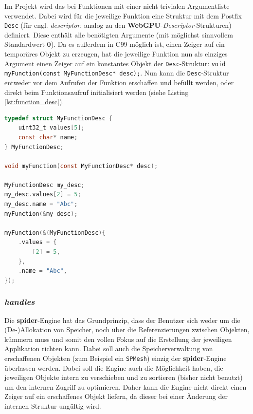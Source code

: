 \documentclass[oneside]{ausarbeitung}
\begin{document}
Im Projekt wird das bei Funktionen mit einer nicht trivialen Argumentliste verwendet. Dabei wird für die jeweilige Funktion eine Struktur mit dem Postfix \texttt{Desc} (für engl. \textit{descriptor}, analog zu den \textbf{WebGPU}-\textit{Descriptor}-Strukturen) definiert. Diese enthält alle benötigten Argumente (mit möglichst sinnvollem Standardwert \textbf{0}). Da es außerdem in C99 möglich ist, einen Zeiger auf ein temporäres Objekt zu erzeugen, hat die jeweilige Funktion nun als einziges Argument einen Zeiger auf ein konstantes Objekt der \texttt{Desc}-Struktur: \texttt{void myFunction(const MyFunctionDesc* desc);}. Nun kann die \texttt{Desc}-Struktur entweder vor dem Aufrufen der Funktion erschaffen und befüllt werden, oder direkt beim Funktionsaufruf initialisiert werden (siehe Listing \ref{lst:function_desc}).

\begin{minipage}{\textwidth}
\begin{lstlisting}[language=C, label={lst:function_desc}, caption={Verwendung einer \textit{Desc}-Struktur zum Übergeben von Argumenten an eine Funktion}]
typedef struct MyFunctionDesc {
	uint32_t values[5];
	const char* name;
} MyFunctionDesc;

void myFunction(const MyFunctionDesc* desc);

MyFunctionDesc my_desc;
my_desc.values[2] = 5;
my_desc.name = "Abc";
myFunction(&my_desc);

myFunction(&(MyFunctionDesc){
	.values = {
		[2] = 5,
	},
	.name = "Abc",
});
\end{lstlisting}
\end{minipage}

\subsubsection{\textit{handles} \cite[Vgl.][]{weissflog:handles}}
\label{subsub:handles}

Die \textbf{spider}-Engine hat das Grundprinzip, dass der Benutzer sich weder um die (De-)Allokation von Speicher, noch über die Referenzierungen zwischen Objekten, kümmern muss und somit den vollen Fokus auf die Erstellung der jeweiligen Applikation richten kann. Dabei soll auch die Speicherverwaltung von erschaffenen Objekten (zum Beispiel ein \texttt{SPMesh}) einzig der \textbf{spider}-Engine überlassen werden. Dabei soll die Engine auch die Möglichkeit haben, die jeweiligen Objekte intern zu verschieben und zu sortieren (bisher nicht benutzt) um den internen Zugriff zu optimieren. Daher kann die Engine nicht direkt einen Zeiger auf ein erschaffenes Objekt liefern, da dieser bei einer Änderung der internen Struktur ungültig wird.
\end{document}
